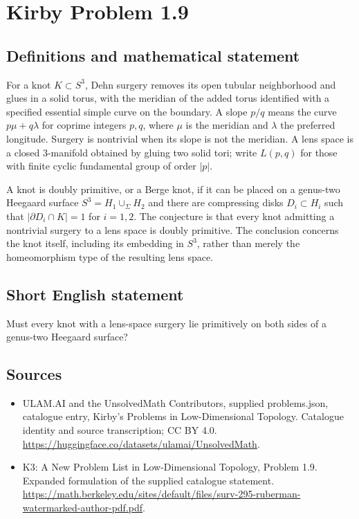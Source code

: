 \documentclass[11pt,a4paper]{article}
\begin{document}
\section*{Kirby Problem 1.9}\label{statement}

\subsection{Definitions and mathematical statement}
For a knot $K\subset S^3$, Dehn surgery removes its open tubular neighborhood and
glues in a solid torus, with the meridian of the added torus identified with a
specified essential simple curve on the boundary. A slope $p/q$ means the curve
$p\mu+q\lambda$ for coprime integers $p,q$, where $\mu$ is the meridian and
$\lambda$ the preferred longitude. Surgery is nontrivial when its slope is not
the meridian.
A lens space is a closed $3$-manifold obtained by gluing two solid tori; write
$L(p,q)$ for those with finite cyclic fundamental group of order $|p|$.

A knot is doubly primitive, or a Berge knot, if it can be placed on a genus-two
Heegaard surface $S^3=H_1\cup_\Sigma H_2$ and there are compressing disks
$D_i\subset H_i$ such that $|\partial D_i\cap K|=1$ for $i=1,2$.
The conjecture is that every knot admitting a nontrivial surgery to a lens space
is doubly primitive. The conclusion concerns the knot itself, including its
embedding in $S^3$, rather than merely the homeomorphism type of the resulting
lens space.
\subsection{Short English statement}
Must every knot with a lens-space surgery lie primitively on both sides of a genus-two Heegaard surface?
\subsection{Sources}
\begin{itemize}
\item[S1] ULAM.AI and the UnsolvedMath Contributors, supplied problems.json, catalogue entry, Kirby's Problems in Low-Dimensional Topology. Catalogue identity and source transcription; CC BY 4.0.
\url{https://huggingface.co/datasets/ulamai/UnsolvedMath}.
\item[S2] K3: A New Problem List in Low-Dimensional Topology, Problem 1.9. Expanded formulation of the supplied catalogue statement.
\url{https://math.berkeley.edu/sites/default/files/surv-295-ruberman-watermarked-author-pdf.pdf}.
\end{itemize}
\end{document}
